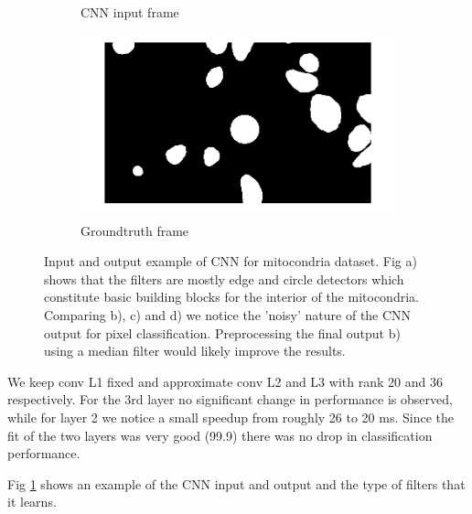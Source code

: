 \begin{figure}[h!]
\begin{subfigure}[b]{0.40\textwidth}
    \caption{CNN input frame}
  \end{subfigure}
  \begin{subfigure}[b]{0.40\textwidth}
    \includegraphics[width=\textwidth]{images/GTframe1.png}
    \caption{Groundtruth frame}
  \end{subfigure}
  \caption{Input and output example of CNN for mitocondria dataset. Fig a) shows that the filters are mostly edge and circle detectors which constitute basic building blocks for the interior of the mitocondria.
  Comparing b), c) and d) we notice the 'noisy' nature of the CNN output for pixel classification. Preprocessing the final output b) using a median filter would likely improve the results.}
  \label{fig:mitocondria}
\end{figure}
We keep conv L1 fixed and approximate conv L2 and L3 with rank 20 and 36 respectively. For the 3rd layer no significant change in performance is observed, while for layer 2 we notice a small speedup from roughly 26 to 20 ms. Since the fit of the two layers was very good (99.9) there was no drop in classification performance.

Fig \ref{fig:mitocondria} shows an example of the CNN input and output and the type of filters that it learns. 
